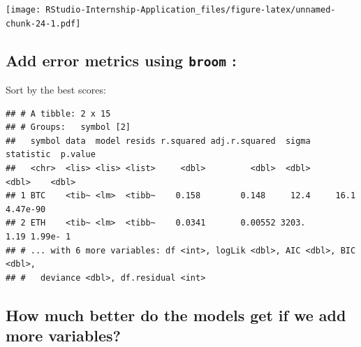 \documentclass[
]{book}
\newenvironment{Shaded}{\begin{snugshade}}{\end{snugshade}}
\newcommand{\DataTypeTok}[1]{\textcolor[rgb]{0.13,0.29,0.53}{#1}}
\newcommand{\KeywordTok}[1]{\textcolor[rgb]{0.13,0.29,0.53}{\textbf{#1}}}
\newcommand{\NormalTok}[1]{#1}
\newcommand{\OperatorTok}[1]{\textcolor[rgb]{0.81,0.36,0.00}{\textbf{#1}}}
\newcommand{\StringTok}[1]{\textcolor[rgb]{0.31,0.60,0.02}{#1}}
\begin{document}
\texttt{[image: RStudio-Internship-Application\_files/figure-latex/unnamed-chunk-24-1.pdf]}

\hypertarget{add-error-metrics-using-broom-r-broom}{%
\subsection{\texorpdfstring{Add error metrics using \texttt{broom} \citep{R-broom}:}{Add error metrics using broom {[}@R-broom{]}:}}\label{add-error-metrics-using-broom-r-broom}}

\begin{Shaded}
\end{Shaded}

Sort by the best scores:

\begin{Shaded}
\end{Shaded}

\begin{verbatim}
## # A tibble: 2 x 15
## # Groups:   symbol [2]
##   symbol data  model resids r.squared adj.r.squared  sigma statistic  p.value
##   <chr>  <lis> <lis> <list>     <dbl>         <dbl>  <dbl>     <dbl>    <dbl>
## 1 BTC    <tib~ <lm>  <tibb~    0.158        0.148     12.4     16.1  4.47e-90
## 2 ETH    <tib~ <lm>  <tibb~    0.0341       0.00552 3203.       1.19 1.99e- 1
## # ... with 6 more variables: df <int>, logLik <dbl>, AIC <dbl>, BIC <dbl>,
## #   deviance <dbl>, df.residual <int>
\end{verbatim}

\hypertarget{how-much-better-do-the-models-get-if-we-add-more-variables}{%
\subsection{How much better do the models get if we add more variables?}\label{how-much-better-do-the-models-get-if-we-add-more-variables}}
\end{document}
